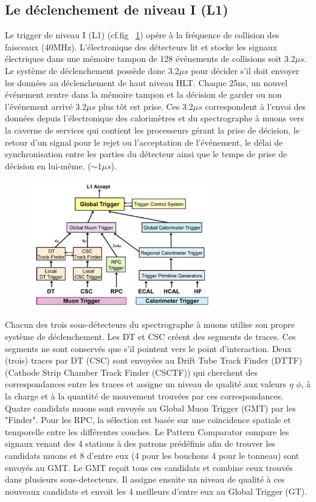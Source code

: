 \subsection{Le déclenchement de niveau I (L1)}
Le trigger de niveau I (L1) (cf.fig~ \ref{L1}) opére à la fréquence de collision des faisceaux (40MHz). L'électronique des détecteurs lit et stocke les  signaux électriques dans une mémoire tampon de 128 événements de collisions soit 3.2$\mu s$. Le système de déclenchement possède donc 3.2$\mu s$ pour  décider s'il doit envoyer les données au déclenchement de haut niveau HLT. Chaque 25ns, un nouvel événement rentre dans la mémoire tampon et la décision de garder ou non l'événement arrivé 3.2$\mu s$ plus tôt est prise. Ces 3.2$\mu s$ correspondent à l'envoi des données depuis l'électronique des calorimètres et du spectrographe à muons vers la caverne de services qui contient les processeurs gérant la prise de décision, le retour d'un signal pour le rejet ou l'acceptation de l'événement, le délai de synchronisation entre les parties du détecteur ainsi que le temps de prise de décision en lui-même. ($\sim1\mu s$). 

	  \begin{figure}[ht!]
	\centering
	\includegraphics[width=0.70\textwidth]{CMS/L1.png}
	\label{L1}
\end{figure}

Chacun des trois sous-détecteurs du spectrographe à muons utilise son propre système de déclenchement. Les DT et CSC créent des segments de traces. Ces segments ne sont conservés que s'il pointent vers le point d'interaction. Deux (trois) traces par DT (CSC) sont envoyées au Drift Tube Track Finder (DTTF) (Cathode Strip Chamber Track Finder (CSCTF)) qui cherchent des correspondances entre les traces et assigne un niveau de qualité  aux valeurs $\eta$ $\phi$, à la charge et à la quantité de mouvement trouvées par ces correspondances. Quatre candidats muons sont envoyés au Global Muon Trigger (GMT) par les "Finder". Pour les RPC, la sélection est basée sur une coïncidence spatiale et temporelle entre les différentes couches. Le Pattern Comparator compare les signaux venant des 4 stations à des patrons prédéfinis afin de trouver les candidats muons et 8 d'entre eux (4 pour les bouchons 4 pour le tonneau) sont envoyés au GMT. Le GMT reçoit tous ces candidats et combine ceux trouvés dans plusieurs sous-detecteurs. Il assigne ensuite un niveau de qualité à ces nouveaux candidats et envoit les 4 meilleurs d'entre eux au Global Trigger (GT).

